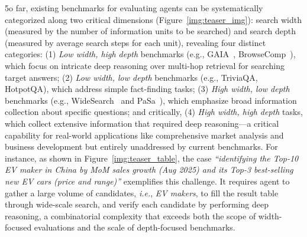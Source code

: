 \documentclass[11pt, letterpaper, logo, onecolumn, copyright, numbering]{paper_improved}
\let\cite\citep
\begin{document}
5o far, existing benchmarks for evaluating agents can be systematically categorized along two critical dimensions (Figure~\ref{img:teaser_img}): search width (measured by the number of information units to be searched) and search depth (measured by average search steps for each unit), revealing four distinct categories: (1) \textit{Low width, high depth} benchmarks (e.g., GAIA~\cite{mialon2023gaiabenchmarkgeneralai}, BrowseComp~\cite{wei2025browsecompsimplechallengingbenchmark}), which focus on intricate deep reasoning over multi-hop retrieval for searching target answers; (2) \textit{Low width, low depth} benchmarks (e.g., TriviaQA, HotpotQA), which address simple fact-finding tasks; (3) \textit{High width, low depth} benchmarks (e.g., WideSearch~\cite{wong2025widesearch} and PaSa~\cite{he2025pasa}), which emphasize broad information collection about specific questions; and critically, (4) \textit{High width, high depth} tasks, which collect extensive information that required deep reasoning—a critical capability for real-world applications like comprehensive market analysis and business development but entirely unaddressed by current benchmarks. 
For instance, as shown in Figure~\ref{img:teaser_table}, the case \textit{``identifying the Top-10 EV maker in China by MoM sales growth (Aug 2025) and its Top-3 best-selling new EV cars (price and range)''} exemplifies this challenge.
It requires agent to gather a large volume of candidates, \textit{i.e.}, \textit{EV makers}, to fill the result table through wide-scale search, and verify each candidate by performing deep reasoning, a combinatorial complexity that exceeds both the scope of width-focused evaluations and the scale of depth-focused benchmarks.
\end{document}
